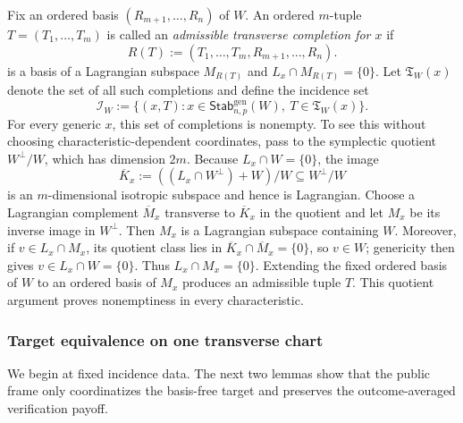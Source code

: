 \documentclass[11pt]{article}
\newcommand{\1}{\mathbf 1}
\theoremstyle{plain}
\theoremstyle{definition}
\theoremstyle{remark}
\begin{document}
Fix an ordered basis $(R_{m+1},\ldots,R_n)$ of $W$.  An ordered $m$-tuple
$T=(T_1,\ldots,T_m)$ is called an \emph{admissible transverse completion for
$x$} if
\begin{equation}
 R(T):=(T_1,\ldots,T_m,R_{m+1},\ldots,R_n).
 \label{eq:fixed-W-ordered-extension}
\end{equation}
is a basis of a Lagrangian subspace $M_{R(T)}$ and
$L_x\cap M_{R(T)}=\{0\}$.  Let $\mathfrak T_W(x)$ denote the set of all such
completions and define the incidence set
\begin{equation}
 \mathcal I_W:=\{(x,T):x\in\mathsf{Stab}_{n,p}^{\mathrm{gen}}(W),\
 T\in\mathfrak T_W(x)\}.
 \label{eq:fixed-W-incidence-set}
\end{equation}
For every generic $x$, this set of completions is nonempty.  To see this
without choosing characteristic-dependent coordinates, pass to the symplectic
quotient $W^\perp/W$, which has dimension $2m$.  Because
$L_x\cap W=\{0\}$, the image
\begin{equation}
 \overline K_x:=((L_x\cap W^\perp)+W)/W
 \subseteq W^\perp/W
 \label{eq:generic-target-quotient-image}
\end{equation}
is an $m$-dimensional isotropic subspace and hence is Lagrangian.  Choose a
Lagrangian complement $\overline M_x$ transverse to $\overline K_x$ in the
quotient and let $M_x$ be its inverse image in $W^\perp$.  Then $M_x$ is a
Lagrangian subspace containing $W$.  Moreover, if $v\in L_x\cap M_x$, its
quotient class lies in
$\overline K_x\cap\overline M_x=\{0\}$, so $v\in W$; genericity then gives
$v\in L_x\cap W=\{0\}$.  Thus $L_x\cap M_x=\{0\}$.  Extending the fixed
ordered basis of $W$ to an ordered basis of $M_x$ produces an admissible tuple
$T$.  This quotient argument proves nonemptiness in every characteristic.

\subsubsection{Target equivalence on one transverse chart}
\label{subsubsec:transverse-chart-target-equivalence}

We begin at fixed incidence data. The next two lemmas show that the public frame only coordinatizes the basis-free target and preserves the outcome-averaged
 verification payoff.
\end{document}
